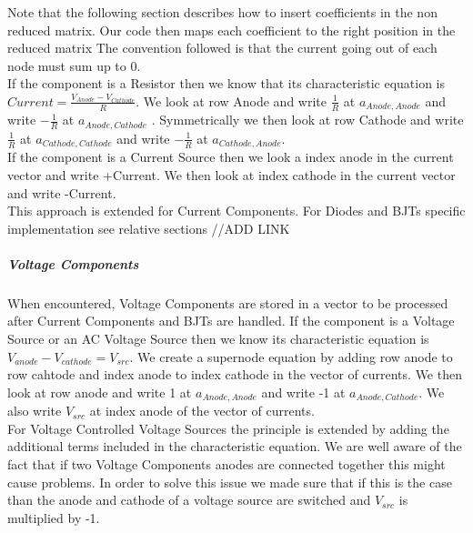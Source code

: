 \documentclass{article}
\begin{document}
Note that the following section describes how to insert coefficients in the non reduced matrix. Our code then maps each coefficient to the right position in the reduced matrix\bigbreak
The convention followed is that the current going out of each node must sum up to 0.\\
If the component is a Resistor then we know that its characteristic equation is $Current = \frac{V_{Anode} - V_{Cathode}}{R}$. We look at row Anode and write $\frac{1}{R}$ at $a_{Anode,Anode}$  and write $-\frac{1}{R}$ at $a_{Anode,Cathode}$ . Symmetrically we then look at row Cathode and write $\frac{1}{R}$ at $a_{Cathode,Cathode}$  and write $-\frac{1}{R}$ at $a_{Cathode,Anode}$.\\
If the component is a Current Source then we look a index anode in the current vector and write +Current. We then look at index cathode in the current vector and write -Current.\\
This approach is extended for Current Components. For Diodes and BJTs specific implementation see relative sections //ADD LINK

\subparagraph{Voltage Components}
When encountered, Voltage Components are stored in a vector to be processed after Current Components and BJTs are handled.\bigbreak
If the component is a Voltage Source or an AC Voltage Source then we know its characteristic equation is $V_{anode}-V_{cathode}=V_{src}$. We create a supernode equation by adding row anode to row cahtode and index anode to index cathode in the vector of currents. We then look at row anode and write 1 at $a_{Anode,Anode}$ and write -1 at $a_{Anode,Cathode}$. We also write $V_{src}$ at index anode of the vector of currents.\\ For Voltage Controlled Voltage Sources the principle is extended by adding the additional terms included in the characteristic equation.\bigbreak
We are well aware of the fact that if two Voltage Components anodes are connected together this might cause problems. In order to solve this issue we made sure that if this is the case than the anode and cathode of a voltage source are switched and $V_{src}$ is multiplied by -1.
\end{document}
